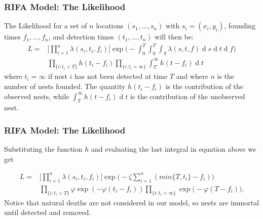 \documentclass[9pt, xcolor={dvipsnames,svgnames,table}]{beamer}
\renewcommand{\d}[1]{\ensuremath{\operatorname{d}\!{#1}}}
\begin{document}
\begin{frame}
\frametitle{RIFA Model: The Likelihood}
    The Likelihood for a set of $n$ locations $(s_{1}, ... , s_{n})$ with $s_i = (x_i, y_i)$, founding times $f_{1}, ... , f_{n}$, and detection times $(t_{1},  ... , t_{n})$ will then be:
    \begin{equation*} \label{eq:like}
        \begin{aligned}
            L = & \Bigg[ \prod_{i = 1}^{n} \lambda(s_{i}, t_{i}, f_{i}) \Bigg] \exp \Bigg(- \int_{0}^{T} \int_{0}^{T} \int_{S} \lambda(s, t, f) \d s \d t \d f \Bigg) \\ 
            & \prod_{\{ i : t_{i} < T \} } h(t_{i} - f_{i}) \prod_{ \{ i : t_{i} = \infty \} } \int_{T}^{\infty} h(t - f_{i}) \d t
        \end{aligned}
    \end{equation*}
    where $t_{i} = \infty$ if nest $i$ has not been detected at time $T$ and where $n$ is the number of nests founded. The quantity $h(t_{i} - f_{i})$ is the contribution of the observed nests, while $\int_{T}^{\infty} h(t - f_{i}) \d t$ is the contribution of the unobserved nest.
\end{frame}




\begin{frame}
    \frametitle{RIFA Model: The Likelihood}
    Substituting the function $h$ and evaluating the last integral in equation above we get

    \begin{equation*}
        \begin{aligned}
            L = & \Bigg[ \prod_{i = 1}^{n} \lambda(s_{i}, t_{i}, f_{i}) \Bigg] \exp \bigg(- \zeta \sum_{i=1}^{n} (min\{ T, t_i \} - f_i) \bigg) \\ 
            & \prod_{\{ i : t_{i} < T \} } \varphi \exp (- \varphi (t_{i} - f_{i})) \prod_{ \{ i : t_{i} = \infty \} } \exp \bigg( - \varphi(T - f_{i}) \bigg).
        \end{aligned}
    \end{equation*}
    \textcolor{PineGreen}{Notice that natural deaths are not considered in our model, so nests are immortal until detected and removed.}
\end{frame}
\end{document}
